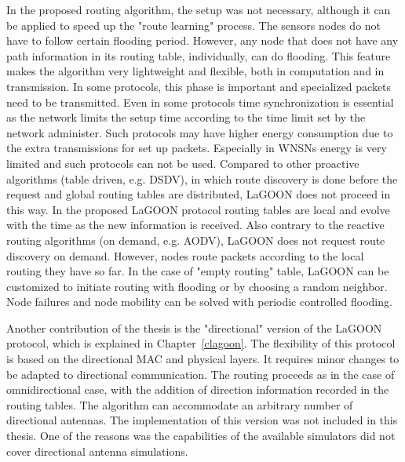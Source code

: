 \documentclass[12pt, oneandhalf, chaparabic, sees, ms]{metu}
\begin{document}
In the proposed routing algorithm, the setup was not necessary, although it can be applied to speed up the "route learning" process.
The sensors nodes do not have to follow certain flooding period. However, any node that does not have any path information in its routing table,
individually, can do flooding. 
This feature makes the algorithm very lightweight and flexible,
both in computation and in transmission.
In some protocols, this phase is important and specialized packets need to be transmitted. Even in some protocols time synchronization 
is essential as the network limits the setup time according to the time limit set by the network administer. Such protocols may have
higher energy consumption due to the extra transmissions for set up packets.
Especially in WNSNs energy is very limited and such protocols can not be used.
Compared to other proactive algorithms (table driven, e.g. DSDV), in which route discovery is done before the request and global routing tables 
are distributed, LaGOON does not proceed in this way. In the proposed LaGOON protocol routing tables are local and evolve 
with the time as the new information is received. Also contrary to the reactive routing algorithms (on demand, e.g. AODV), LaGOON does not request route
discovery on demand. However, nodes route packets according to the local routing they have so far. In the case of "empty routing" table, 
LaGOON can be customized to initiate routing with flooding or by choosing a random neighbor. 
Node failures and node mobility can be solved with periodic controlled flooding.

Another contribution of the thesis is the "directional" version of the LaGOON protocol, which is explained in Chapter~\ref{clagoon}.
The flexibility of this protocol is based on the directional MAC and physical layers. It requires minor changes to be adapted to directional
communication. The routing proceeds as in the case of omnidirectional case, with the addition of direction information recorded in the routing tables.
The algorithm can accommodate an arbitrary number of directional antennas. The implementation of this version was not included in this thesis.
One of the reasons was the capabilities of the available simulators did not cover directional antenna simulations.













\newpage
\end{document}
